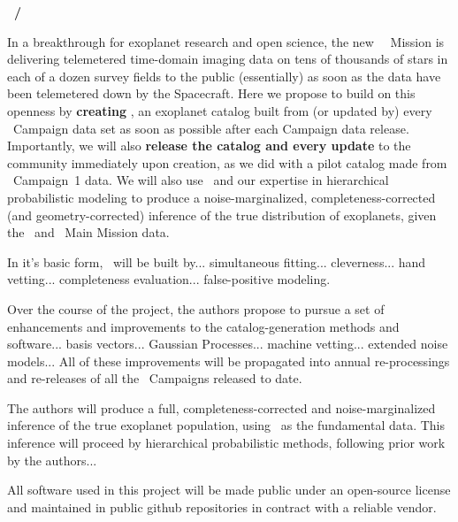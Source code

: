 \documentclass[12pt]{article}
\begin{document}
\noindent\textbf{\shortauthor~/~\fulltitle}
\bigskip

In a breakthrough for exoplanet research and open science, the new
\kepler\ \ketu\ Mission is delivering telemetered time-domain imaging
data on tens of thousands of stars in each of a dozen survey fields to
the public (essentially) as soon as the data have been telemetered
down by the Spacecraft.
Here we propose to build on this openness by \textbf{creating
  \catalogname}, an exoplanet catalog built from (or updated by)
every \ketu\ Campaign data set as soon as possible after each Campaign
data release.
Importantly, we will also \textbf{release the catalog and every
  update} to the community immediately upon creation, as we did with
a pilot catalog made from \ketu\ Campaign~1 data.
We will also use \catalogname\ and our expertise in hierarchical
probabilistic modeling to produce a noise-marginalized,
completeness-corrected (and geometry-corrected) inference of the true
distribution of exoplanets, given the \ketu\ and \kepler\ Main Mission
data.

In it's basic form, \catalogname\ will be built by... simultaneous
fitting... cleverness... hand vetting... completeness
evaluation... false-positive modeling.

Over the course of the project, the authors propose to pursue a set of
enhancements and improvements to the catalog-generation methods and
software... basis vectors... Gaussian Processes... machine
vetting... extended noise models...
All of these improvements will be propagated into annual
re-processings and re-releases of all the \ketu\ Campaigns released to
date.

The authors will produce a full, completeness-corrected and
noise-marginalized inference of the true exoplanet population, using
\catalogname\ as the fundamental data.
This inference will proceed by hierarchical probabilistic methods,
following prior work by the authors...

All software used in this project will be made public under an
open-source license and maintained in public github repositories in
contract with a reliable vendor.
\end{document}
